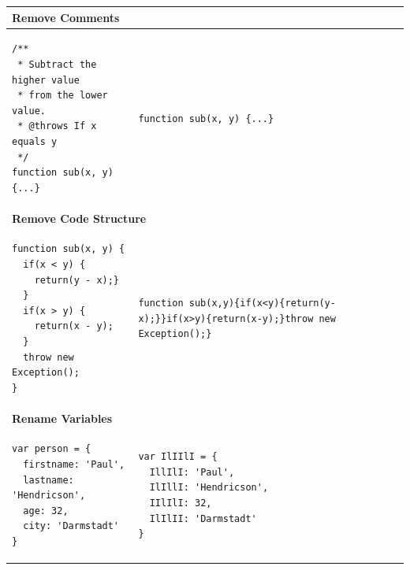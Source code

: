 			\begin{table}
				\begin{tabular}{|p{0.473\textwidth}|p{}|} \hline
					\multicolumn{2}{|l|}{\textbf{Remove Comments}} \\ \hline
					\begin{lstlisting}
/**
 * Subtract the higher value 
 * from the lower value.
 * @throws If x equals y
 */
function sub(x, y) {...}
					\end{lstlisting} &
					\begin{lstlisting}
function sub(x, y) {...}
					\end{lstlisting} \\ \hline
					\multicolumn{2}{|l|}{\textbf{Remove Code Structure}} \\ \hline
					\begin{lstlisting}
function sub(x, y) {
  if(x < y) {
    return(y - x);}
  }
  if(x > y) {
    return(x - y);
  }
  throw new Exception();
}
					\end{lstlisting} &
					\begin{lstlisting}
function sub(x,y){if(x<y){return(y-x);}}if(x>y){return(x-y);}throw new Exception();}
					\end{lstlisting} \\ \hline
					\multicolumn{2}{|l|}{\textbf{Rename Variables}} \\ \hline
					\begin{lstlisting}
var person = {
  firstname: 'Paul',
  lastname: 'Hendricson',
  age: 32,
  city: 'Darmstadt'
}
					\end{lstlisting} &
					\begin{lstlisting}
var IlIIlI = {
  IllIlI: 'Paul',
  IlIllI: 'Hendricson',
  IIlIlI: 32,
  IlIlII: 'Darmstadt'
}
					\end{lstlisting} \\ \hline
				\end{tabular}
			\end{table}
			
